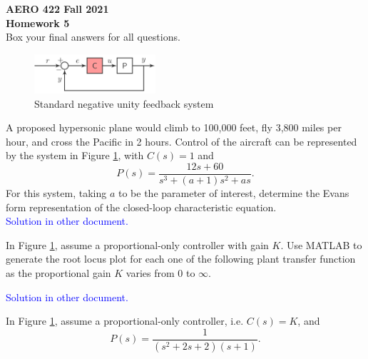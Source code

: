 \documentclass[10.5pt,letter]{exam}
\newcommand{\ans}[1]{\textcolor{blue}{#1}}
\begin{document}
\begin{center}
    {\bf AERO 422 Fall 2021\\
    Homework 5} \\
    Box your final answers for all questions.
\end{center}

\begin{questions}
    \begin{figure}[hbt!]
        \centering
        \includegraphics[width=0.4\textwidth]{AERO_422_HW5_P1.png}
        \caption{Standard negative unity feedback system}
        \label{fig:CLsys}
    \end{figure}
\question[3] A proposed hypersonic plane would climb to 100,000 feet, fly 3,800 miles per hour, and cross
the Pacific in 2 hours. Control of the aircraft can be represented by the system in Figure \ref{fig:CLsys}, with $C(s)=1$ and $$P(s) = \frac{12s+60}{s^3+(a+1)s^2+as}.$$
For this system, taking $a$ to be the parameter of interest, determine the Evans form representation
of the closed-loop characteristic equation.\\
\ans{Solution in other document.}

\question[3] In Figure \ref{fig:CLsys}, assume a proportional-only controller with gain $K$.
Use MATLAB to generate the root locus plot for each one of the following plant transfer function as the proportional gain $K$ varies from 0 to $\infty$. 
\ans{Solution in other document.}

\question In Figure \ref{fig:CLsys}, assume a proportional-only controller, i.e. $C(s)=K$, and $$ P(s) = \frac{1}{(s^2+2s+2)(s+1)} .$$
\end{questions}
\end{document}

